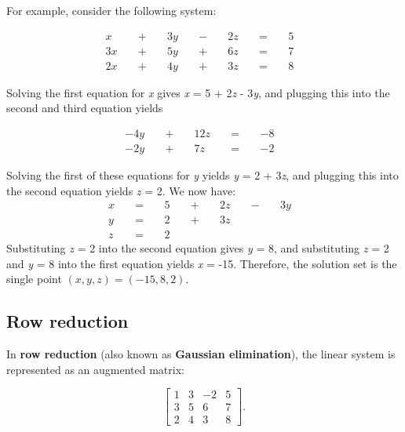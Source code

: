 For example, consider the following system:



\begin{align}
 x &&\; + \;&& 3y &&\; - \;&& 2z &&\; = \;&& 5 & \\
 3x &&\; + \;&& 5y &&\; + \;&& 6z &&\; = \;&& 7 & \\
 2x &&\; + \;&& 4y &&\; + \;&& 3z &&\; = \;&& 8 &
\end{align}

Solving the first equation for \textit{x} gives \textit{x} = 5 + 2\textit{z} -
3\textit{y}, and plugging this into the second and third equation yields



\begin{align} -4y & & \; + \; & & 12z & & \; = \; & & -8 & \\ -2y & & \; + \; & & 7z & & \; = \; & & -2 & \end{align}



Solving the first of these equations for \textit{y} yields \textit{y} = 2 + 3\textit{z},
and plugging this into the second equation yields \textit{z} = 2. We now have:
\begin{align}
 x &&\; = \;&& 5 &&\; + \;&& 2z &&\; - \;&& 3y & \\
  y &&\; = \;&& 2 &&\; + \;&& 3z && && & \\
   z &&\; = \;&& 2 && && && && &
\end{align}
Substituting \textit{z} = 2 into the second equation gives \textit{y} = 8, and
substituting \textit{z} = 2 and \textit{y} = 8 into the first equation yields \textit{x} =
-15. Therefore, the solution set is the single point $(x, y, z) = (-15, 8, 2)$.




\subsection{Row reduction}
\label{sss:rowr-b255}




In \textbf{row reduction} (also known as \textbf{Gaussian elimination}), the linear system
is represented as an augmented matrix:



$$\left[\begin{array}{rrr|r}
1 & 3 & -2 & 5 \\
3 & 5 & 6 & 7 \\
2 & 4 & 3 & 8
\end{array}\right]\text{.}$$

